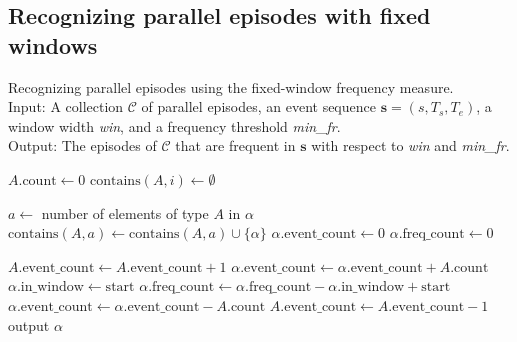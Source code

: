 
\subsection{Recognizing parallel episodes with fixed windows}

\begin{algorithm}

\caption{Recognizing parallel episodes using the fixed-window frequency measure. \\
Input: A collection $ \mathcal{C} $ of parallel episodes, an event sequence $ \boldsymbol{s} = (s, T_s, T_e) $, a window width \textit{win}, and a frequency threshold \textit{min\_fr}. \\
Output: The episodes of $ \mathcal{C} $ that are frequent in $ \boldsymbol{s} $ with respect to \textit{win} and \textit{min\_fr}.
}

\begin{algorithmic}[1]

        \State $ A \text{.count} \gets 0 $
         $ \text{contains}(A, i) \gets \emptyset $ \EndFor
    \EndFor
\EndFor

        \State $ a \gets $ number of elements of type $ A $ in $ \alpha $
        \State $ \text{contains}(A, a) \gets \text{contains}(A, a) \cup \{ \alpha \} $
    \EndFor
    \State $ \alpha \text{.event\_count} \gets 0 $
    \State $ \alpha \text{.freq\_count} \gets 0 $
\EndFor

     \label{alglin:rec-par-fwi:new-events}
        \State $ A \text{.event\_count} \gets A \text{.event\_count} + 1 $
            \State $ \alpha \text{.event\_count} \gets \alpha \text{.event\_count} + A \text{.count} $
             $ \alpha \text{.in\_window} \gets \text{start} $
            \EndIf
        \EndFor
    \EndFor
     \label{alglin:rec-par-fwi:old-events}
                \State $ \alpha \text{.freq\_count} \gets \alpha \text{.freq\_count} - \alpha \text{.in\_window} + \text{start} $
            \EndIf
            \State $ \alpha \text{.event\_count} \gets \alpha \text{.event\_count} - A \text{.count} $
        \EndFor
        \State $ A \text{.event\_count} \gets A \text{.event\_count} - 1 $
    \EndFor
\EndFor
{}
     output $ \alpha $
    \EndIf
\EndFor


\end{algorithmic}
\end{algorithm}
